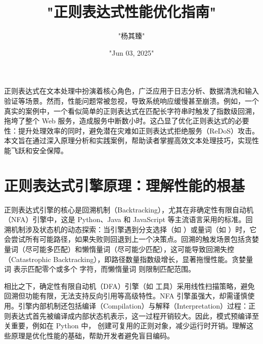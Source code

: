 \title{"正则表达式性能优化指南"}
\author{"杨其臻"}
\date{"Jun 03, 2025"}
\maketitle
正则表达式在文本处理中扮演着核心角色，广泛应用于日志分析、数据清洗和输入验证等场景。然而，性能问题常被忽视，导致系统响应缓慢甚至崩溃。例如，一个真实的案例中，一个看似简单的正则表达式在匹配长字符串时触发了指数级回溯，拖垮了整个 Web 服务，造成服务中断数小时。这凸显了优化正则表达式的必要性：提升处理效率的同时，避免潜在灾难如正则表达式拒绝服务（ReDoS）攻击。本文旨在通过深入原理分析和实践案例，帮助读者掌握高效文本处理技巧，实现性能飞跃和安全保障。\par
\chapter{正则表达式引擎原理：理解性能的根基}
正则表达式引擎的核心是回溯机制（Backtracking），尤其在非确定性有限自动机（NFA）引擎中，这是 Python、Java 和 JavaScript 等主流语言采用的标准。回溯机制涉及状态机的动态探索：当引擎遇到分支选择（如 ）或量词（如 ）时，它会尝试所有可能路径，如果失败则回退到上一个决策点。回溯的触发场景包括贪婪量词（尽可能多匹配）和懒惰量词（尽可能少匹配），这可能导致回溯失控（Catastrophic Backtracking），即路径数量指数级增长，显著拖慢性能。贪婪量词  表示匹配零个或多个  字符，而懒惰量词  则限制匹配范围。\par
相比之下，确定性有限自动机（DFA）引擎（如  工具）采用线性扫描策略，避免回溯但功能有限，无法支持反向引用等高级特性。NFA 引擎虽强大，却需谨慎使用。引擎内部机制还包括编译（Compilation）与解释（Interpretation）过程：正则表达式首先被编译成内部状态机表示，这一过程开销较大。因此，模式预编译至关重要，例如在 Python 中， 创建可复用的正则对象，减少运行时开销。理解这些原理是优化性能的基础，帮助开发者避免盲目编码。\par

